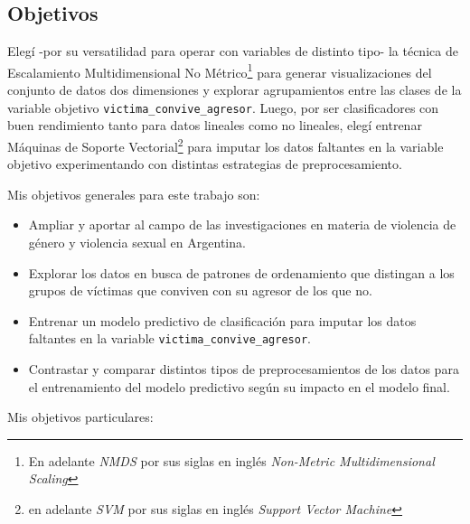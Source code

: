 \documentclass[10 pt]{article}
\begin{document}
\subsection{Objetivos}

Elegí -por su versatilidad para operar con variables de distinto tipo- la técnica de Escalamiento Multidimensional No Métrico\footnote{En adelante \textit{NMDS} por sus siglas en inglés \textit{Non-Metric Multidimensional Scaling}} para generar visualizaciones del conjunto de datos dos dimensiones y explorar agrupamientos entre las clases de la variable objetivo \texttt{victima\_convive\_agresor}. Luego, por ser clasificadores con buen rendimiento tanto para datos lineales como no lineales, elegí entrenar Máquinas de Soporte Vectorial\footnote{en adelante \textit{SVM} por sus siglas en inglés \textit{Support Vector Machine}} para imputar los datos faltantes en la variable objetivo experimentando con distintas estrategias de preprocesamiento. 


Mis objetivos generales para este trabajo son:

\begin{itemize}
    \item Ampliar y aportar al campo de las investigaciones en materia de violencia de género y violencia sexual en Argentina.
    \item Explorar los datos en busca de patrones de ordenamiento que distingan a los grupos de víctimas que conviven con su agresor de los que no.
    \item Entrenar un modelo predictivo de clasificación para imputar los datos faltantes en la variable \texttt{victima\_convive\_agresor}. 
    \item Contrastar y comparar distintos tipos de preprocesamientos de los datos para el entrenamiento del modelo predictivo según su impacto en el modelo final. 

\end{itemize}

Mis objetivos particulares:
\end{document}
